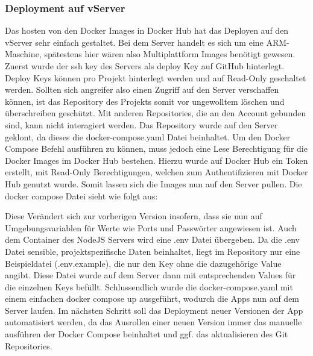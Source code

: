 \subsubsection{Deployment auf vServer}
Das hosten von den Docker Images in Docker Hub hat das Deployen auf den vServer sehr einfach gestaltet.
Bei dem Server handelt es sich um eine ARM-Maschine, spätestens hier wären also Multiplattform Images benötigt gewesen.
Zuerst wurde der ssh key des Servers als deploy Key auf GitHub hinterlegt.
Deploy Keys können pro Projekt hinterlegt werden und auf Read-Only geschaltet werden.
Sollten sich angreifer also einen Zugriff auf den Server verschaffen können, ist das Repository des Projekts somit vor ungewolltem löschen und überschreiben geschützt.
Mit anderen Repositories, die an den Account gebunden sind, kann nicht interagiert werden.
Das Repository wurde auf den Server geklont, da dieses die docker-compose.yaml Datei beinhaltet.
Um den Docker Compose Befehl ausführen zu können, muss jedoch eine Lese Berechtigung für die Docker Images im Docker Hub bestehen.
Hierzu wurde auf Docker Hub ein Token erstellt, mit Read-Only Berechtigungen, welchen zum Authentifizieren mit Docker Hub genutzt wurde.
Somit lassen sich die Images nun auf den Server pullen.
Die docker compose Datei sieht wie folgt aus:



Diese Verändert sich zur vorherigen Version insofern, dass sie nun auf Umgebungsvariablen für Werte wie Ports und Passwörter angewiesen ist.
Auch dem Container des NodeJS Servers wird eine .env Datei übergeben.
Da die .env Datei sensible, projektspezifische Daten beinhaltet, liegt im Repository nur eine Beispieldatei (.env.example), die nur den Key ohne die dazugehörige Value angibt.
Diese Datei wurde auf dem Server dann mit entsprechenden Values für die einzelnen Keys befüllt.
Schlussendlich wurde die docker-compose.yaml mit einem einfachen docker compose up ausgeführt, wodurch die Apps nun auf dem Server laufen.
Im nächsten Schritt soll das Deployment neuer Versionen der App automatisiert werden, da das Ausrollen einer neuen Version immer das manuelle ausführen der Docker Compose beinhaltet und ggf. das aktualisieren des Git Repositories.
